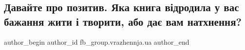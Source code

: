  
 
 
 
 

\subsection{Давайте про позитив. Яка книга відродила у вас бажання жити і творити, або дає вам натхнення?}
\label{sec:07_02_2023.fb.fb_group.vrazhennja.ua.1.davaite_pro_pozitiv_}

\ifcmt
 author_begin
   author_id fb_group.vrazhennja.ua
 author_end
\fi
